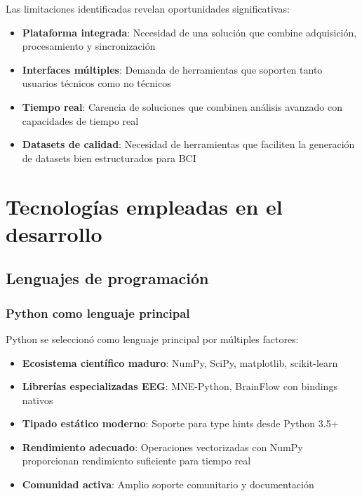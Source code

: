 Las limitaciones identificadas revelan oportunidades significativas:

\begin{itemize}
    \item \textbf{Plataforma integrada}: Necesidad de una solución que combine adquisición, procesamiento y sincronización
    \item \textbf{Interfaces múltiples}: Demanda de herramientas que soporten tanto usuarios técnicos como no técnicos
    \item \textbf{Tiempo real}: Carencia de soluciones que combinen análisis avanzado con capacidades de tiempo real
    \item \textbf{Datasets de calidad}: Necesidad de herramientas que faciliten la generación de datasets bien estructurados para BCI
\end{itemize}

\section{Tecnologías empleadas en el desarrollo}
\label{sec:tecnologias_empleadas}

\subsection{Lenguajes de programación}
\label{subsec:lenguajes}

\subsubsection{Python como lenguaje principal}
Python se seleccionó como lenguaje principal por múltiples factores:

\begin{itemize}
    \item \textbf{Ecosistema científico maduro}: NumPy, SciPy, matplotlib, scikit-learn
    \item \textbf{Librerías especializadas EEG}: MNE-Python, BrainFlow con bindings nativos
    \item \textbf{Tipado estático moderno}: Soporte para type hints desde Python 3.5+
    \item \textbf{Rendimiento adecuado}: Operaciones vectorizadas con NumPy proporcionan rendimiento suficiente para tiempo real
    \item \textbf{Comunidad activa}: Amplio soporte comunitario y documentación
\end{itemize}

